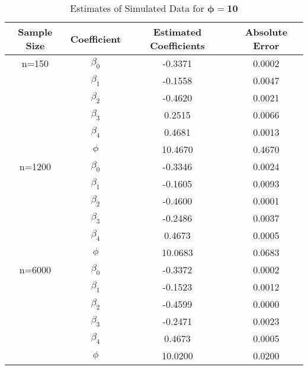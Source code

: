 \documentclass{svproc}
\begin{document}
\begin{table}[H]
\caption{Estimates of Simulated Data for $\bm{\phi=10}$}
\fontsize{9}{10}\selectfont
\begin{center}
\begin{tabular}{|c|c|c|c|}
\hline
\textbf{Sample Size} & \textbf{Coefficient} & \textbf{Estimated Coefficients} & \textbf{Absolute Error} \\
\hline
n=150 & $\beta_0$ & -0.3371 & 0.0002 \\
 & $\beta_1$ & -0.1558 & 0.0047 \\
 & $\beta_2$ & -0.4620 & 0.0021 \\
 & $\beta_3$ & 0.2515 & 0.0066 \\
 & $\beta_4$ & 0.4681 & 0.0013 \\
 & $\phi$ & 10.4670 & 0.4670 \\
\hline
n=1200 & $\beta_0$ & -0.3346 & 0.0024 \\
 & $\beta_1$ & -0.1605 & 0.0093 \\
 & $\beta_2$ & -0.4600 & 0.0001 \\
 & $\beta_3$ & -0.2486 & 0.0037 \\
 & $\beta_4$ & 0.4673 & 0.0005 \\
 & $\phi$ & 10.0683 & 0.0683 \\
\hline
n=6000 & $\beta_0$ & -0.3372 & 0.0002 \\
 & $\beta_1$ & -0.1523 & 0.0012 \\
 & $\beta_2$ & -0.4599 & 0.0000 \\
 & $\beta_3$ & -0.2471 & 0.0023 \\
 & $\beta_4$ & 0.4673 & 0.0005 \\
 & $\phi$ & 10.0200 &  0.0200 \\
\hline
\end{tabular}
\label{tab:est10}
\end{center}
\end{table}
\end{document}
